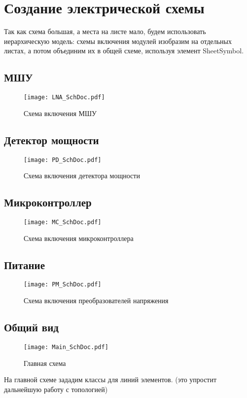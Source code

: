 \chapter{Создание электрической схемы} \label{chap:altium-SchDoc}

Так как схема большая, а места на листе мало, будем использовать иерархическую модель: схемы включения модулей изобразим на отдельных листах, а потом объединим их в общей схеме, используя элемент SheetSymbol.
\section{МШУ}

\begin{figure}[H]
	\centering
	\texttt{[image: LNA\_SchDoc.pdf]}
	\caption{Схема включения МШУ}%
	\label{fig:LNA-SchDoc}
\end{figure}

\section{Детектор мощности}

\begin{figure}[H]
	\centering
	\texttt{[image: PD\_SchDoc.pdf]}
	\caption{Схема включения детектора мощности}%
	\label{fig:PD-SchDoc}
\end{figure}

\section{Микроконтроллер}

\begin{figure}[H]
	\centering
	\texttt{[image: MC\_SchDoc.pdf]}
	\caption{Схема включения микроконтроллера}%
	\label{fig:MC-SchDoc}
\end{figure}

\section{Питание}

\begin{figure}[H]
	\centering
	\texttt{[image: PM\_SchDoc.pdf]}
	\caption{Схема включения преобразователей напряжения}%
	\label{fig:PM-SchDoc}
\end{figure}

\section{Общий вид}

\begin{figure}[H]
	\centering
	\texttt{[image: Main\_SchDoc.pdf]}
	\caption{Главная схема}%
	\label{fig:Main_SchDoc}
\end{figure}

На главной схеме зададим классы для линий элементов. (это упростит дальнейшую работу с топологией)